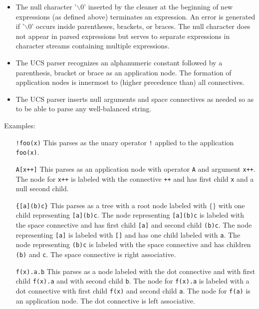 \documentclass{article}
\newcommand{\mtt}[1]{\mbox{\tt #1}}
\begin{document}
\begin{itemize}
\item The null character '$\backslash$0' inserted by the cleaner at the beginning of new expressions (as defined above) terminates an expression.
  An error is generated if '$\backslash$0' occurs inside parentheses, brackets, or braces.  The null character does not appear in parsed expressions but serves to separate
  expressions in character streams containing multiple expressions.

\item The UCS parser recognizes an alphanumeric constant followed by a parenthesis, bracket or brace as an application node.  The formation of application
nodes is innermost to (higher precedence than) all connectives.

\item The UCS parser inserts null arguments and space connectives as needed so as to be able to parse any well-balanced string.
\end{itemize}

\noindent Examples:

\begin{enumerate}

\item[\mtt{!foo(x)}] This parses as the unary operator \mtt{!} applied to the application \mtt{foo(x)}.

\item[\mtt{A[x++]}] This parses as an application node with operator \mtt{A} and argument \mtt{x++}.  The node for \mtt{x++}
is labeled with the connective \mtt{++} and has first child \mtt{x} and a null second
child.

\item[\mtt{\{[a](b)c\}}] This parses as a tree with a root node labeled with $\{\}$ with one child representing \mtt{[a](b)c}.  The node representing
\mtt{[a](b)c} is labeled with the space connective and has first child \mtt{[a]} and second child \mtt{(b)c}.  The node representing \mtt{[a]}
is labeled with \mtt{[]} and has one child labeled with \mtt{a}.
The node representing \mtt{(b)c} is labeled with the space connective and has children \mtt{(b)} and \mtt{c}.  The space connective is right associative.

\item[\mtt{f(x).a.b}] This parses as a node labeled with the dot connective and with first child \mtt{f(x).a} and with second child \mtt{b}.
The node for \mtt{f(x).a} is labeled with a dot connective with first child \mtt{f(x)} and second child \mtt{a}.  The node for \mtt{f(a)} is an application node.
The dot connective is left associative.
\end{enumerate}
\end{document}
